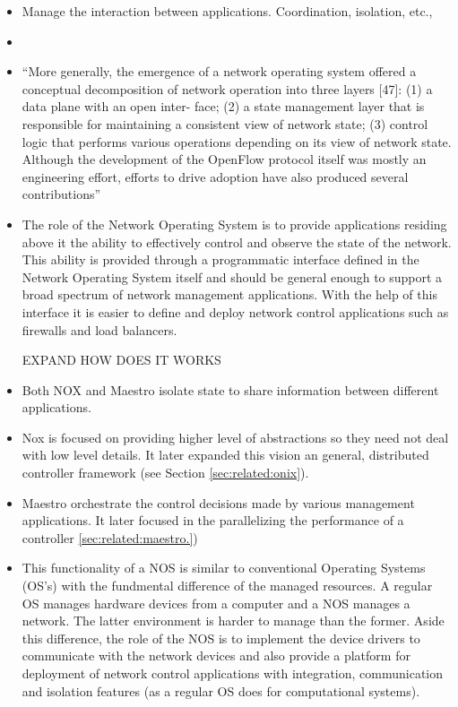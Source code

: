 \begin{itemize}
\begin{itemize}
\item Manage the interaction between applications. Coordination, isolation, etc., 
\item 
\item ``More generally, the emergence of a network operating system offered a conceptual decomposition of network operation into three layers [47]: (1) a data plane with an open inter- face; (2) a state management layer that is responsible for maintaining a consistent view of network state; (3) control logic that performs various operations depending on its view of network state. Although the development of the OpenFlow protocol itself was mostly an engineering effort, efforts to drive adoption have also produced several contributions''
\item The role of the Network Operating System is to provide applications residing above it the ability to effectively control and observe the state of the network. This ability is provided through a programmatic interface defined in the Network Operating System itself and should be general enough to support a broad spectrum of  network management applications. With the help of this interface it is easier to define and deploy network control applications such as firewalls and load balancers. 

EXPAND HOW DOES IT WORKS
\item Both NOX and Maestro isolate state to share information between different applications. 
\item Nox is focused on providing higher level of abstractions so they need not deal with low level details. It later expanded this vision an general, distributed controller framework (see Section \ref{sec:related:onix}). 

\item Maestro orchestrate the control decisions made by various management applications. It later focused in the parallelizing the performance of a controller \ref{sec:related:maestro.})  

\item This functionality of a NOS is similar to conventional  Operating Systems (OS's) with the fundmental difference of the managed resources. A regular OS manages hardware devices from a computer  and  a NOS manages a network. The latter environment is harder to manage than the former.  Aside this difference, the role of the NOS is to implement the device drivers to communicate with the network devices and also provide a platform for deployment of network control applications with integration, communication and isolation features (as a regular OS does for computational systems). 


\end{itemize}
\end{itemize}
